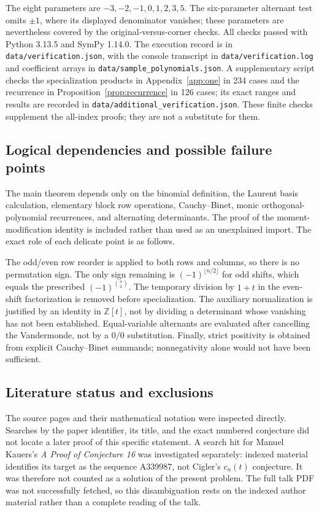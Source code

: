 \documentclass[11pt]{article}
\theoremstyle{definition}
\theoremstyle{remark}
\newcommand{\Z}{\mathbb Z}
\numberwithin{equation}{section}
\begin{document}
The eight parameters are $-3,-2,-1,0,1,2,3,5$. The six-parameter
alternant test omits $\pm1$, where its displayed denominator vanishes;
these parameters are nevertheless covered by the original-versus-corner
checks. All checks passed with Python 3.13.5 and SymPy 1.14.0.
The execution record is in \texttt{data/verification.json}, with the
console transcript in \texttt{data/verification.log} and coefficient
arrays in \texttt{data/sample\_polynomials.json}. A supplementary script
checks the specialization products in Appendix~\ref{app:one} in 234 cases
and the recurrence in Proposition~\ref{prop:recurrence} in 126 cases; its
exact ranges and results are recorded in
\texttt{data/additional\_verification.json}.
These finite checks supplement the all-index proofs; they are not a
substitute for them.

\subsection{Logical dependencies and possible failure points}
The main theorem depends only on the binomial definition, the Laurent
basis calculation, elementary block row operations, Cauchy--Binet,
monic orthogonal-polynomial recurrences, and alternating determinants.
The proof of the moment-modification identity is included rather than
used as an unexplained import. The exact role of each delicate point is
as follows.

The odd/even row reorder is applied to both rows and columns, so there is
no permutation sign. The only sign remaining is $(-1)^{\lfloor n/2\rfloor}$
for odd shifts, which equals the prescribed $(-1)^{\binom n2}$.
The temporary division by $1+t$ in the even-shift factorization is removed
before specialization. The auxiliary normalization is justified by an
identity in $\Z[t]$, not by dividing a determinant whose vanishing has
not been established. Equal-variable alternants are evaluated after
cancelling the Vandermonde, not by a $0/0$ substitution. Finally,
strict positivity is obtained from explicit Cauchy--Binet summands;
nonnegativity alone would not have been sufficient.

\subsection{Literature status and exclusions}
The source pages and their mathematical notation were inspected directly.
Searches by the paper identifier, its title, and the exact numbered
conjecture did not locate a later proof of this specific statement.
A search hit for Manuel Kauers's \emph{A Proof of Conjecture 16} \cite{KauersIndex} was
investigated separately: indexed material identifies its target as the
sequence A339987, not Cigler's $c_n(t)$ conjecture. It was therefore not
counted as a solution of the present problem. The full talk PDF was not
successfully fetched, so this disambiguation rests on the indexed author
material rather than a complete reading of the talk.
\end{document}
